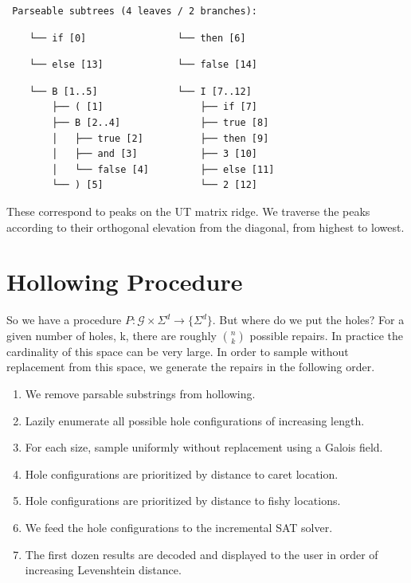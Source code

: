 \documentclass[sigplan,nonacm]{acmart}\settopmatter{printfolios=false,printccs=false,printacmref=false}
\begin{document}
\begin{verbatim}
 Parseable subtrees (4 leaves / 2 branches):
\end{verbatim}
\hspace{0.6cm}\hspace{4cm}
\begin{verbatim}
    └── if [0]                └── then [6]
\end{verbatim}
\hspace{0.6cm}\hspace{4cm}
\begin{verbatim}
    └── else [13]             └── false [14]
\end{verbatim}
\hspace{0.6cm}\hspace{4cm}
\begin{verbatim}
    └── B [1..5]              └── I [7..12]
        ├── ( [1]                 ├── if [7]
        ├── B [2..4]              ├── true [8]
        │   ├── true [2]          ├── then [9]
        │   ├── and [3]           ├── 3 [10]
        │   └── false [4]         ├── else [11]
        └── ) [5]                 └── 2 [12]
\end{verbatim}

These correspond to peaks on the UT matrix ridge. We traverse the peaks according to their orthogonal elevation from the diagonal, from highest to lowest.

\section{Hollowing Procedure}

So we have a procedure $P: \mathcal{G} \times \Sigma^d \rightarrow \{\Sigma^d\}$. But where do we put the holes? For a given number of holes, k, there are roughly ${n \choose k}$ possible repairs. In practice the cardinality of this space can be very large. In order to sample without replacement from this space, we generate the repairs in the following order.

\begin{enumerate}
  \item We remove parsable substrings from hollowing.
  \item Lazily enumerate all possible hole configurations of   increasing length.
  \item For each size, sample uniformly without replacement using a   Galois field.
  \item Hole configurations are prioritized by distance to caret   location.
  \item Hole configurations are prioritized by distance to fishy   locations.
  \item We feed the hole configurations to the incremental SAT solver.
  \item The first dozen results are decoded and displayed to the user in order of increasing Levenshtein distance.
\end{enumerate}
\end{document}
